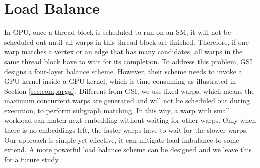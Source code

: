 \section{Load Balance} In GPU, once a thread block is scheduled to run on an SM, it will not be scheduled out until all warps in this
thread block are finished. Therefore, if one warp matches a vertex or an edge that has many candidates, all warps in the same thread block
have to wait for its completion. To address this problem, GSI designs a four-layer balance scheme. However, their scheme needs to invoke a
GPU kernel inside a GPU kernel, which is time-consuming as illustrated in Section \ref{sec:compargsi}. Different from GSI, we use fixed
warps, which means the maximum concurrent warps are generated and will not be scheduled out during execution, to perform subgraph matching.
In this way, a warp with small workload can match next embedding without waiting for other warps. Only when there is no embeddings left,
the faster warps have to wait for the slower warps. Our approach is simple yet effective, it can mitigate load imbalance to some extend. A
more powerful load balance scheme can be designed and we leave this for a future study.

